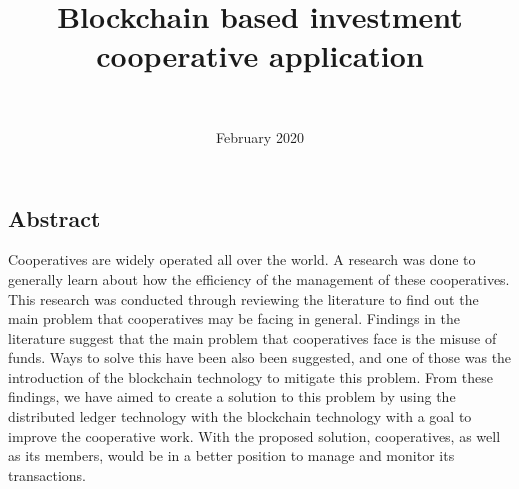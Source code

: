 \documentclass{article}
\begin{document}
\title{Blockchain based investment cooperative application}
\author{\\
}
\date{February 2020}

\maketitle

\begin{flushleft}
\section{Abstract}
Cooperatives are widely operated all over the world. A research was done to generally learn about how the efficiency of the management of these cooperatives. This research was conducted through reviewing the literature to find out the main problem that cooperatives may be facing in general. Findings in the literature suggest that the main problem that cooperatives face is the misuse of funds. Ways to solve this have been also been suggested, and one of those was the introduction of the blockchain technology to mitigate this problem. From these findings, we have aimed to create a solution to this problem by using the distributed ledger technology with the blockchain technology with a goal to improve the cooperative work. With the proposed solution, cooperatives, as well as its members, would be in a better position to manage and monitor its transactions.


\end{flushleft}
\end{document}
